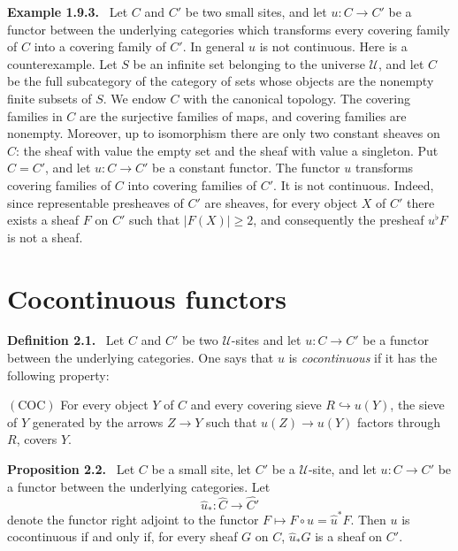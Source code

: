 \documentclass[11pt]{article}
\newcommand{\U}{\mathcal{U}}
\newenvironment{statement}[1]{\par\medskip\noindent\textbf{#1.}\ }{\par\medskip}
\newenvironment{remarktext}[1]{\par\medskip\noindent\textbf{#1.}\ }{\par\medskip}
\begin{document}
\begin{remarktext}{Example 1.9.3}
Let \(C\) and \(C'\) be two small sites, and let \(u:C\to C'\) be a functor between the underlying categories which transforms every covering family of \(C\) into a covering family of \(C'\). In general \(u\) is not continuous. Here is a counterexample. Let \(S\) be an infinite set belonging to the universe \(\U\), and let \(C\) be the full subcategory of the category of sets whose objects are the nonempty finite subsets of \(S\). We endow \(C\) with the canonical topology. The covering families in \(C\) are the surjective families of maps, and covering families are nonempty. Moreover, up to isomorphism there are only two constant sheaves on \(C\): the sheaf with value the empty set and the sheaf with value a singleton. Put \(C=C'\), and let \(u:C\to C'\) be a constant functor. The functor \(u\) transforms covering families of \(C\) into covering families of \(C'\). It is not continuous. Indeed, since representable presheaves of \(C'\) are sheaves, for every object \(X\) of \(C'\) there exists a sheaf \(F\) on \(C'\) such that \(|F(X)|\ge2\), and consequently the presheaf \(u^\flat F\) is not a sheaf.
\end{remarktext}

\section{Cocontinuous functors}

\begin{statement}{Definition 2.1}
Let \(C\) and \(C'\) be two \(\U\)-sites and let \(u:C\to C'\) be a functor between the underlying categories. One says that \(u\) is \emph{cocontinuous} if it has the following property:

\smallskip
\noindent\((\mathrm{COC})\) For every object \(Y\) of \(C\) and every covering sieve \(R\hookrightarrow u(Y)\), the sieve of \(Y\) generated by the arrows \(Z\to Y\) such that \(u(Z)\to u(Y)\) factors through \(R\), covers \(Y\).
\end{statement}

\begin{statement}{Proposition 2.2}
Let \(C\) be a small site, let \(C'\) be a \(\U\)-site, and let \(u:C\to C'\) be a functor between the underlying categories. Let
\[
\widehat u_*:\widehat C\to\widehat{C'}
\]
denote the functor right adjoint to the functor \(F\mapsto F\circ u=\widehat u^*F\). Then \(u\) is cocontinuous if and only if, for every sheaf \(G\) on \(C\), \(\widehat u_*G\) is a sheaf on \(C'\).
\end{statement}
\end{document}
